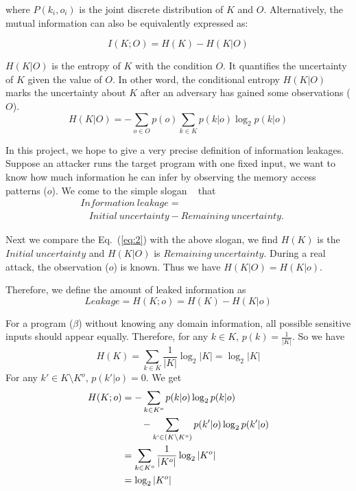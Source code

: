 where $P(k_i, o_i)$ is the joint discrete distribution of $K$ and $O$.
Alternatively, the mutual information can also be equivalently expressed as:

\begin{equation} \label{eq:2}
    I(K;O) = H(K) - H(K|O)
\end{equation}

$H(K|O)$ is the entropy of $K$ with the condition $O$. It quantifies the
uncertainty of $K$ given the value of $O$. In other word, the conditional
entropy $H(K|O)$ marks the uncertainty about $K$ after an adversary has gained
some observations ($O$).
\begin{equation}
    H(K|O) = - \sum_{o {\in} O} {p(o) \sum_{k {\in} K}{p(k|o)\log_2p(k|o)}}
\end{equation}

In this project, we hope to give a very precise definition of information
leakages. Suppose an attacker runs the target program with one
fixed input, we want to know how much information he can infer by observing the
memory access patterns ($o$). We come to the simple slogan
~\cite{10.1007/978-3-642-00596-1_21} %
that
\begin{align*}
     & \mathit{Information\ leakage} =                                       \\
     & ~~~~ \mathit{Initial\ uncertainty} - \mathit{Remaining\ uncertainty}.
\end{align*}

Next we compare the Eq.~(\ref{eq:2}) with the above slogan, we find $H(K)$
is the $\mathit{Initial\ uncertainty}$ and $H(K|O)$ is $\mathit{Remaining\
        uncertainty}$. During a real attack, the observation ($o$) is known.  Thus we
have $H(K|O) = H(K|o)$.

Therefore, we define the amount of leaked information as
\begin{displaymath}
    Leakage = H(K;o) = H(K) - H(K|o)
\end{displaymath}

For a program ($\beta$) without knowing any domain information, all possible sensitive
inputs should appear equally. Therefore, for any $k \in K$, $p(k) =
    \frac{1}{|K|}$. So we have
$$H(K) = \sum_{k {\in} K}\frac{1}{|K|}\log_2{|K|} = \log_2{|K|}$$
For any $k' \in K \setminus K^o$, $p(k'|o) = 0$. We get
\begin{align*}
    H(K;o) & = - \sum_{k {\in} K^o}{p(k|o)\log_2p(k|o)}                         \\
           & \qquad   - \sum_{k` {\in} (K \setminus K^o)}{p(k'|o)\log_2p(k'|o)} \\
           & = \sum_{k {\in} K^o}\frac{1}{|K^o|}\log_2{|K^o|}                   \\
           & = \log_2{|K^o|}
\end{align*}


